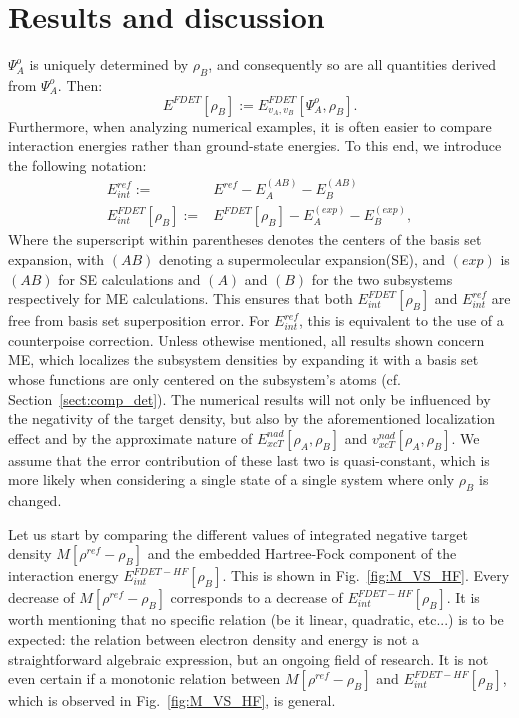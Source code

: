 \documentclass[journal=jctcce,manuscript=article, layout=twocolumn]{achemso}
\begin{document}
\section{Results and discussion}
$\Psi^{o}_A$ is uniquely determined by $\rho_B$, and consequently so are all quantities derived from $\Psi^{o}_A$. Then:
\begin{equation}
 E^{FDET}[\rho_B] := E_{v_A,v_B}^{FDET}[\Psi^{o}_{A},\rho_B].
\end{equation}
Furthermore, when analyzing numerical examples, it is often easier to compare interaction energies rather than ground-state energies. To this end, we introduce the following notation:
\begin{align}
 E^{ref}_{int} := & E^{ref} - E^{(AB)}_A - E^{(AB)}_B \\ \nonumber
 E^{FDET}_{int}[\rho_B] := & E^{FDET}[\rho_B] - E^{(exp)}_A - E^{(exp)}_B,
\end{align}
Where the superscript within parentheses denotes the centers of the basis set expansion, with $(AB)$ denoting a supermolecular expansion(SE), and $(exp)$ is $(AB)$ for SE calculations and $(A)$ and $(B)$ for the two subsystems respectively for ME calculations. This ensures that both $E^{FDET}_{int}[\rho_B]$ and  $E^{ref}_{int}$ are free from basis set superposition error. For $E^{ref}_{int}$, this is equivalent to the use of a counterpoise correction\cite{Boys1970}.
Unless othewise mentioned, all results shown concern ME, which localizes the subsystem densities by expanding it with a basis set whose functions are only centered on the subsystem's atoms (cf. Section~\ref{sect:comp_det}).
The numerical results will not only be influenced by the negativity of the target density, but also by the aforementioned localization effect and by the approximate nature of $E_{xcT}^{nad}[\rho_A, \rho_B]$ and $v_{xcT}^{nad}[\rho_A, \rho_B]$. We assume that the error contribution of these last two is quasi-constant, which is more likely when considering a single state of a single system where only $\rho_B$ is changed.

Let us start by comparing the different values of integrated negative target density $M[\rho^{ref} - \rho_B]$ and the embedded Hartree-Fock component of the interaction energy $E^{FDET-HF}_{int}[\rho_B]$. This is shown in Fig.~\ref{fig:M_VS_HF}.
Every decrease of $M[\rho^{ref} - \rho_B]$ corresponds to a decrease of $E^{FDET-HF}_{int}[\rho_B]$. It is worth mentioning that no specific relation (be it linear, quadratic, etc...) is to be expected: the relation between electron density and energy is not a straightforward algebraic expression, but an ongoing field of research. It is not even certain if a monotonic relation between $M[\rho^{ref} - \rho_B]$ and $E^{FDET-HF}_{int}[\rho_B]$, which is observed in Fig.~\ref{fig:M_VS_HF}, is general.
\end{document}
